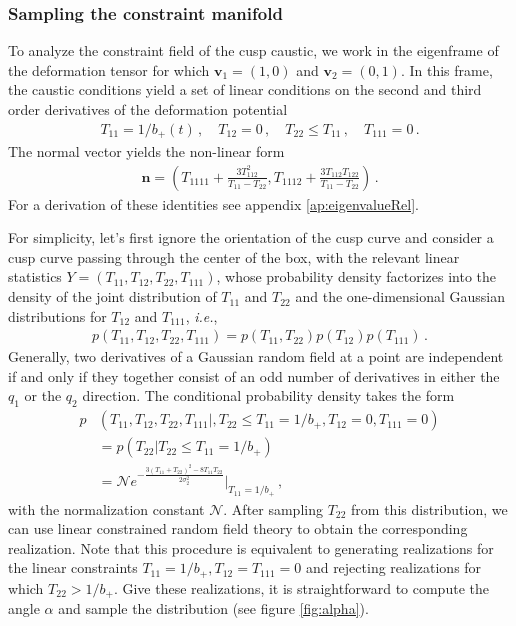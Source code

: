 \documentclass[a4paper, 11pt]{article}
\begin{document}
\subsubsection{Sampling the constraint manifold}
To analyze the constraint field of the cusp caustic, we work in the eigenframe of the deformation tensor for which $\bm{v}_1=(1,0)$ and $\bm{v}_2=(0,1)$. In this frame, the caustic conditions yield a set of linear conditions on the second and third order derivatives of the deformation potential
\begin{align}
T_{11}=1/b_+(t)\,, \quad T_{12}=0\,,\quad T_{22}\leq T_{11}\,,\quad T_{111}=0\,.\label{eq:cusp_cond_1}
\end{align}
The normal vector yields the non-linear form
\begin{align}
\bm{n}=\left(T_{1111} + \frac{3T_{112}^2}{T_{11}-T_{22}}, T_{1112} + \frac{3T_{112}T_{122}}{T_{11}-T_{22}}\right)\,.\label{eq:cusp_cond_2}
\end{align}
For a derivation of these identities see appendix \ref{ap:eigenvalueRel}.

For simplicity, let's first ignore the orientation of the cusp curve and consider a cusp curve passing through the center of the box, with the relevant linear statistics $Y=(T_{11},T_{12},T_{22},T_{111})$, whose probability density factorizes into the density of the joint distribution of $T_{11}$ and $T_{22}$ and the one-dimensional Gaussian distributions for $T_{12}$ and $T_{111}$, \textit{i.e.},
\begin{align}
p(T_{11},T_{12},T_{22},T_{111}) = p(T_{11},T_{22})p(T_{12})p(T_{111})\,.
\end{align}
Generally, two derivatives of a Gaussian random field at a point are independent if and only if they together consist of an odd number of derivatives in either the $q_1$ or the $q_2$ direction. The conditional probability density takes the form
\begin{align}
p&(T_{11},T_{12},T_{22},T_{111}|,T_{22}\leq T_{11}=1/b_+,T_{12}=0,T_{111}=0) \nonumber\\
&= p(T_{22}| T_{22} \leq T_{11}=1/b_+)\nonumber\\
&= \mathcal{N} e^{-\frac{3(T_{11} + T_{22})^2 - 8 T_{11} T_{22}}{2 \sigma_2^2}}\big|_{T_{11}=1/b_+}\,,
\end{align}
with the normalization constant $\mathcal{N}$. After sampling $T_{22}$ from this distribution, we can use linear constrained random field theory to obtain the corresponding realization. Note that this procedure is equivalent to generating realizations for the linear constraints $T_{11}=1/b_+,T_{12}=T_{111}=0$ and rejecting realizations for which $T_{22} > 1/b_+$. Give these realizations, it is straightforward to compute the angle $\alpha$ and sample the distribution (see figure \ref{fig:alpha}).
\end{document}
